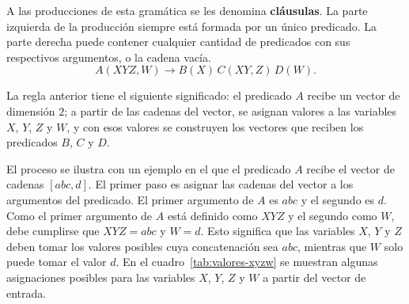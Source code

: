 \documentclass{report}
\theoremstyle{definition}
\theoremstyle{plain}
\theoremstyle{remark}
\begin{document}

A las producciones de esta gramática se les denomina \textbf{cláusulas}.
La parte izquierda de la producción siempre está formada por un único
predicado. La parte derecha puede contener cualquier cantidad de
predicados con sus respectivos argumentos, o la cadena vacía. 
\[
  A(XYZ, W) \to B(X)\, C(XY, Z)\, D(W).
\]

La regla anterior tiene el siguiente significado: el predicado $A$
recibe un vector de dimensión $2$; a partir de las cadenas del vector,
se asignan valores a las variables $X$, $Y$, $Z$ y $W$, y con esos
valores se construyen los vectores que reciben los predicados $B$, $C$
y $D$.

El proceso se ilustra con un ejemplo en el que el predicado $A$ recibe
el vector de cadenas $[abc, d]$. El primer paso es asignar las cadenas
del vector a los argumentos del predicado. El primer argumento de $A$
es $abc$ y el segundo es $d$. Como el primer argumento de $A$ está
definido como $XYZ$ y el segundo como $W$, debe cumplirse que $XYZ = abc$
y $W = d$. Esto significa que las variables $X$, $Y$ y $Z$ deben tomar
los valores posibles cuya concatenación sea $abc$, mientras que $W$ solo
puede tomar el valor $d$. En el cuadro~\ref{tab:valores-xyzw} se
muestran algunas asignaciones posibles para las variables $X$, $Y$, $Z$
y $W$ a partir del vector de entrada.
\end{document}
